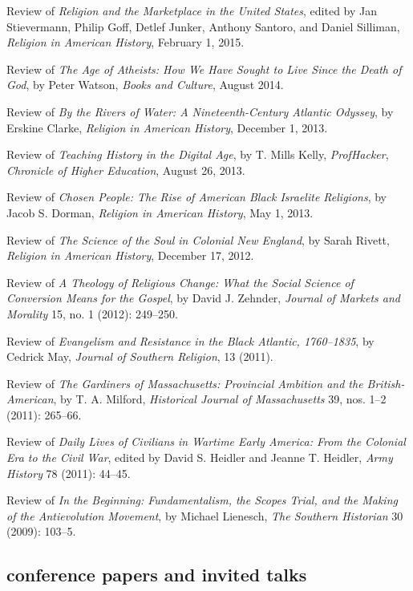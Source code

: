 \documentclass[11pt]{article}
\begin{document}
Review of \emph{Religion and the Marketplace in the United States},
edited by Jan Stievermann, Philip Goff, Detlef Junker, Anthony Santoro,
and Daniel Silliman, \emph{Religion in American History}, February 1,
2015.

Review of \emph{The Age of Atheists: How We Have Sought to Live Since
  the Death of God}, by Peter Watson, \emph{Books and Culture}, August
2014.

Review of \emph{By the Rivers of Water: A Nineteenth-Century Atlantic
  Odyssey}, by Erskine Clarke, \emph{Religion in American History},
December 1, 2013.

Review of \emph{Teaching History in the Digital Age}, by T. Mills Kelly,
\emph{ProfHacker}, \emph{Chronicle of Higher Education}, August 26,
2013.

Review of \emph{Chosen People: The Rise of American Black Israelite
  Religions}, by Jacob S. Dorman, \emph{Religion in American History}, May
1, 2013.

Review of \emph{The Science of the Soul in Colonial New England}, by
Sarah Rivett, \emph{Religion in American History}, December 17, 2012.

Review of \emph{A Theology of Religious Change: What the Social Science
  of Conversion Means for the Gospel}, by David J. Zehnder, \emph{Journal
  of Markets and Morality} 15, no. 1 (2012): 249--250.

Review of \emph{Evangelism and Resistance in the Black Atlantic,
  1760--1835}, by Cedrick May, \emph{Journal of Southern Religion}, 13
(2011).

Review of \emph{The Gardiners of Massachusetts: Provincial Ambition and
  the British-American}, by T. A. Milford, \emph{Historical Journal of
  Massachusetts} 39, nos. 1--2 (2011): 265--66.

Review of \emph{Daily Lives of Civilians in Wartime Early America: From
  the Colonial Era to the Civil War}, edited by David S. Heidler and
Jeanne T. Heidler, \emph{Army History} 78 (2011): 44--45.

Review of \emph{In the Beginning: Fundamentalism, the Scopes Trial, and
  the Making of the Antievolution Movement}, by Michael Lienesch,
\emph{The Southern Historian} 30 (2009): 103--5.

\subsection{conference papers and invited 
  talks}\label{conference-papers-invited-talks}
\end{document}
